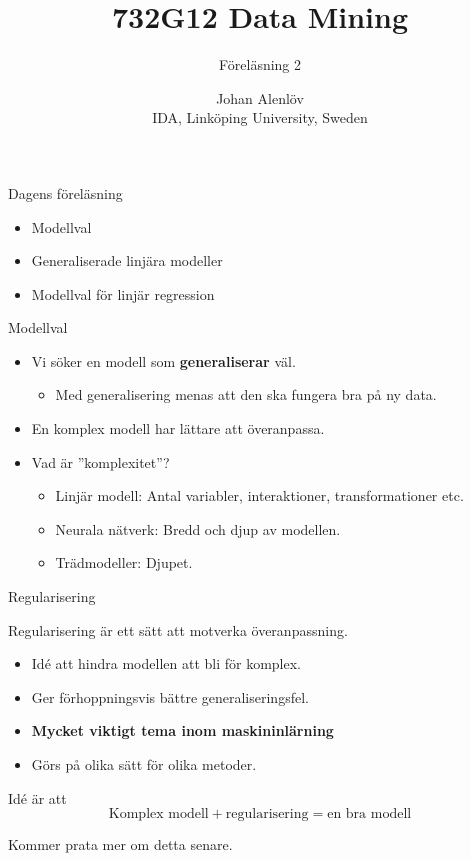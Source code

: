 \documentclass[10pt,english]{beamer}
\title{732G12 Data Mining}
\subtitle{Föreläsning 2}
\date{}
\author{Johan Alenlöv \\ IDA, Linköping University, Sweden}
\begin{document}
\maketitle

\begin{frame}{Dagens föreläsning}
    
    \begin{itemize}
        \item Modellval
        \item Generaliserade linjära modeller
        \item Modellval för linjär regression
    \end{itemize}

\end{frame}

\begin{frame}{Modellval}
    
    \begin{itemize}
        \item Vi söker en modell som \textbf{generaliserar} väl.
        \begin{itemize}
            \item Med generalisering menas att den ska fungera bra på ny data.
        \end{itemize}
        \item En komplex modell har lättare att överanpassa.
        \item Vad är ''komplexitet''?
        \begin{itemize}
            \item Linjär modell: Antal variabler, interaktioner, transformationer etc.
            \item Neurala nätverk: Bredd och djup av modellen.
            \item Trädmodeller: Djupet.
        \end{itemize}
    \end{itemize}

\end{frame}

\begin{frame}{Regularisering}

    Regularisering är ett sätt att motverka överanpassning.

    \begin{itemize}
        \item Idé att hindra modellen att bli för komplex.
        \item Ger förhoppningsvis bättre generaliseringsfel.
        \item \textbf{Mycket viktigt tema inom maskininlärning}
        \item Görs på olika sätt för olika metoder.
    \end{itemize}

    Idé är att
    \begin{equation*}
        \text{Komplex modell} + \text{regularisering} = \text{en bra modell}
    \end{equation*}

    Kommer prata mer om detta senare.

\end{frame}
\end{document}
